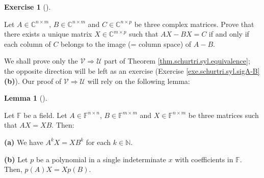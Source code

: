 \documentclass[numbers=enddot,12pt,final,onecolumn,notitlepage]{scrartcl}%
\newcounter{exer}
\numberwithin{exer}{subsection}
\theoremstyle{definition}
\newtheorem{lem}[theo]{Lemma}
\newenvironment{lemma}[1][]
{\begin{lem}[#1]\begin{leftbar}}
{\end{leftbar}\end{lem}}
\newtheorem{exmp}[exer]{Exercise}
\newenvironment{exercise}[1][]
{\begin{exmp}[#1]\begin{leftbar}}
{\end{leftbar}\end{exmp}}
\begin{document}
\begin{exercise}
\label{exe.schurtri.syl.AX-BX} Let $A\in\mathbb{C}^{n\times m}$,
$B\in\mathbb{C}^{n\times m}$ and $C\in\mathbb{C}^{n\times p}$ be three complex
matrices. Prove that there exists a unique matrix $X\in\mathbb{C}^{m\times p}$
such that $AX-BX=C$ if and only if each column of $C$ belongs to the image (=
column space) of $A-B$.
\end{exercise}

We shall prove only the $\mathcal{V}\Longrightarrow\mathcal{U}$ part of
Theorem \ref{thm.schurtri.syl.equivalence}; the opposite direction will be
left as an exercise (Exercise \ref{exe.schurtri.syl.sigA-B} \textbf{(b)}). Our
proof of $\mathcal{V}\Longrightarrow\mathcal{U}$ will rely on the following lemma:

\begin{lemma}
\label{lem.schurtri.syl.AX=XB}Let $\mathbb{F}$ be a field. Let $A\in
\mathbb{F}^{n\times n}$, $B\in\mathbb{F}^{m\times m}$ and $X\in\mathbb{F}%
^{n\times m}$ be three matrices such that $AX=XB$. Then: \medskip

\textbf{(a)} We have $A^{k}X=XB^{k}$ for each $k\in\mathbb{N}$. \medskip

\textbf{(b)} Let $p$ be a polynomial in a single indeterminate $x$ with
coefficients in $\mathbb{F}$. Then, $p\left(  A\right)  X=Xp\left(  B\right)
$.
\end{lemma}
\end{document}
